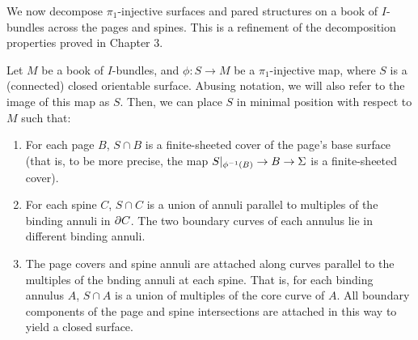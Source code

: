 We now decompose $\pi_1$-injective surfaces and pared structures on a book of
$I$-bundles across the pages and spines. This is a refinement of the
decomposition properties proved in Chapter 3.

\begin{lemma}

Let $M$ be a book of $I$-bundles, and $\phi\colon S \to M$ be
a $\pi_1$-injective map, where $S$ is a (connected) closed orientable surface.
Abusing notation, we will also refer to the image of this map as $S$. Then, we
can place $S$ in minimal position with respect to $M$ such that:

\begin{enumerate}

\item For each page $B$, $S \cap B$ is a finite-sheeted cover of the page's
base surface (that is, to be more precise, the map $S|_{\phi^{-1}(B)} \to B \to
\Sigma$ is a finite-sheeted cover).

\item For each spine $C$, $S \cap C$ is a union of annuli parallel to multiples
of the binding annuli in $\partial C$. The two boundary curves of each annulus lie
in different binding annuli.

\item The page covers and spine annuli are attached along curves parallel to
the multiples of the bnding annuli at each spine. That is, for each binding
annulus $A$, $S \cap A$ is a union of multiples of the core curve of $A$. All
boundary components of the page and spine intersections are attached in this
way to yield a closed surface.

\end{enumerate}

\end{lemma}

